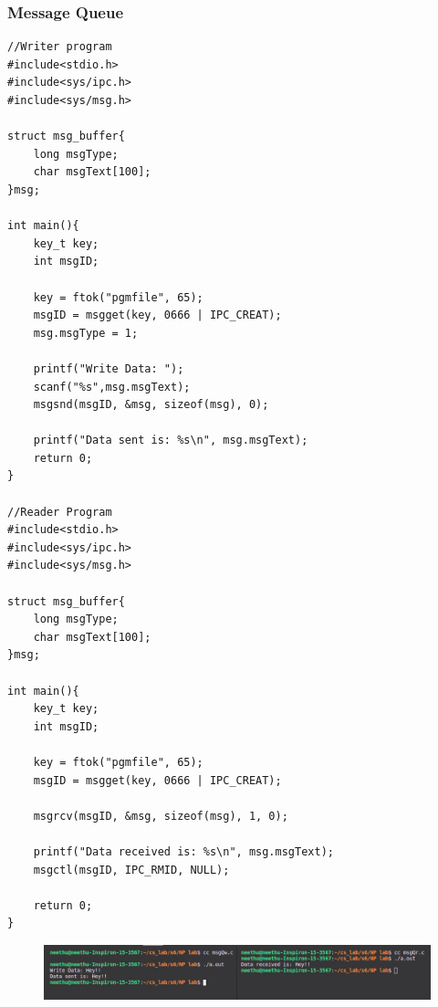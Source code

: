\subsubsection{Message Queue}
\begin{verbatim}
//Writer program
#include<stdio.h>
#include<sys/ipc.h>
#include<sys/msg.h>

struct msg_buffer{
    long msgType;
    char msgText[100];
}msg;

int main(){
    key_t key;
    int msgID;

    key = ftok("pgmfile", 65);
    msgID = msgget(key, 0666 | IPC_CREAT);
    msg.msgType = 1;

    printf("Write Data: ");
    scanf("%s",msg.msgText);
    msgsnd(msgID, &msg, sizeof(msg), 0);

    printf("Data sent is: %s\n", msg.msgText);
    return 0;
}

//Reader Program
#include<stdio.h>
#include<sys/ipc.h>
#include<sys/msg.h>

struct msg_buffer{
    long msgType;
    char msgText[100];
}msg;

int main(){
    key_t key;
    int msgID;

    key = ftok("pgmfile", 65);
    msgID = msgget(key, 0666 | IPC_CREAT);
    
    msgrcv(msgID, &msg, sizeof(msg), 1, 0);

    printf("Data received is: %s\n", msg.msgText);
    msgctl(msgID, IPC_RMID, NULL);
    
    return 0;
}
\end{verbatim}
\begin{figure}[h]
            \centering
            \includegraphics[scale=0.47]{img/e43.png}
\end{figure}

